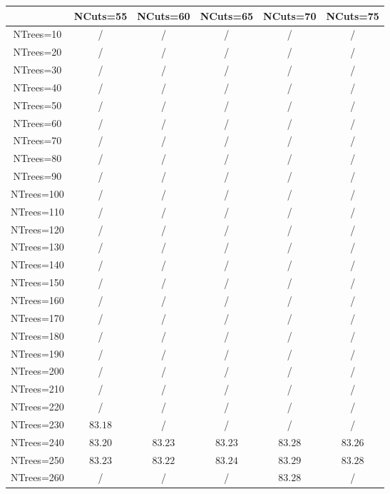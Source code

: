 \centering
\begin{tabular}{|c|c|c|c|c|c|} \hline
 & NCuts=55 & NCuts=60 & NCuts=65 & NCuts=70 & NCuts=75\\\hline
NTrees=10 &  / &  / &  / &  / &  /\\\hline
NTrees=20 &  / &  / &  / &  / &  /\\\hline
NTrees=30 &  / &  / &  / &  / &  /\\\hline
NTrees=40 &  / &  / &  / &  / &  /\\\hline
NTrees=50 &  / &  / &  / &  / &  /\\\hline
NTrees=60 &  / &  / &  / &  / &  /\\\hline
NTrees=70 &  / &  / &  / &  / &  /\\\hline
NTrees=80 &  / &  / &  / &  / &  /\\\hline
NTrees=90 &  / &  / &  / &  / &  /\\\hline
NTrees=100 &  / &  / &  / &  / &  /\\\hline
NTrees=110 &  / &  / &  / &  / &  /\\\hline
NTrees=120 &  / &  / &  / &  / &  /\\\hline
NTrees=130 &  / &  / &  / &  / &  /\\\hline
NTrees=140 &  / &  / &  / &  / &  /\\\hline
NTrees=150 &  / &  / &  / &  / &  /\\\hline
NTrees=160 &  / &  / &  / &  / &  /\\\hline
NTrees=170 &  / &  / &  / &  / &  /\\\hline
NTrees=180 &  / &  / &  / &  / &  /\\\hline
NTrees=190 &  / &  / &  / &  / &  /\\\hline
NTrees=200 &  / &  / &  / &  / &  /\\\hline
NTrees=210 &  / &  / &  / &  / &  /\\\hline
NTrees=220 &  / &  / &  / &  / &  /\\\hline
NTrees=230 & $83.18$ &  / &  / &  / &  /\\\hline
NTrees=240 & $83.20$ & $83.23$ & $83.23$ & $83.28$ & $83.26$\\\hline
NTrees=250 & $83.23$ & $83.22$ & $83.24$ & $83.29$ & $83.28$\\\hline
NTrees=260 &  / &  / &  / & $83.28$ &  /\\\hline
\end{tabular}
